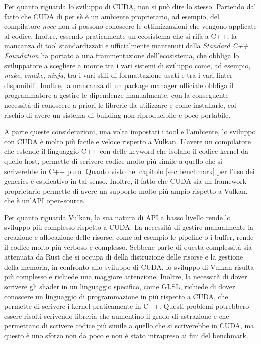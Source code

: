 \newpage

Per quanto riguarda lo sviluppo di CUDA, non si può dire lo stesso. Partendo dal fatto che CUDA di per sè è un ambiente proprietario, ad esempio, del compilatore \textit{nvcc} non si possono conoscere le ottimizzazioni che vengono applicate al codice. Inoltre, essendo praticamente un ecosistema che si rifà a C++, la mancanza di tool standardizzati e ufficialmente mantenuti dalla \textit{Standard C++ Foundation} ha portato a una frammentazione dell'ecosistema, che obbliga lo sviluppatore a scegliere a monte tra i vari sistemi di sviluppo come, ad esempio, \textit{make}, \textit{cmake}, \textit{ninja}, tra i vari stili di formattazione usati e tra i vari linter disponibili. Inoltre, la mancanza di un package manager ufficiale obbliga il programmatore a gestire le dipendenze manualmente, con la conseguente necessità di conoscere a priori le librerie da utilizzare e come installarle, col rischio di avere un sistema di building non riproducibile e poco portabile.

A parte queste considerazioni, una volta impostati i tool e l'ambiente, lo sviluppo con CUDA è molto più facile e veloce rispetto a Vulkan. L'avere un 
compilatore che estende il linguaggio C++ con delle keyword che isolano il 
codice kernel da quello host, permette di scrivere codice molto più simile a quello che si scriverebbe in C++ puro. Quanto visto nel capitolo \ref{sec:benchmark} per l'uso dei generics è esplicativo in tal senso. Inoltre, il fatto che CUDA sia un framework proprietario permette di avere un supporto molto più ampio rispetto a Vulkan, che è un'API open-source.


Per quanto riguarda Vulkan, la sua natura di API a basso livello rende lo sviluppo più complesso rispetto a CUDA. La necessità di gestire manualmente la creazione e allocazione delle risorse, come ad esempio le pipeline o i buffer, rende il codice molto più verboso e complesso. Sebbene parte di questa complessità sia attenuata da Rust che si occupa di della distruzione delle risorse e la gestione della memoria, in confronto allo sviluppo di CUDA, lo sviluppo di Vulkan risulta più complesso e richiede una maggiore attenzione. Inoltre, la necessità di dover scrivere gli shader in un linguaggio specifico, come GLSL, richiede di dover conoscere un linguaggio di programmazione in più rispetto a CUDA, che permette di scrivere i kernel praticamente in C++.
Questi problemi potrebbero essere risolti scrivendo libreria che aumentino il grado di astrazione e che permettano di scrivere codice più simile a quello che si scriverebbe in CUDA, ma questo è uno sforzo non da poco e non è stato intrapreso ai fini del benchmark.


